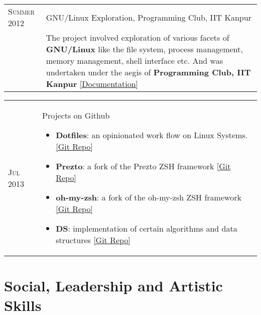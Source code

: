 \documentclass[a4paper,10pt]{article} %
\newcommand{\project}[3]{
    \begin{tabular}{>{\raggedleft}p{2.2cm}|p{17cm}}
        \textsc{#1} & \textcolor{NavyBlue}{#2} \\
                    & \footnotesize{#3} \\
    \end{tabular}
}
\newcommand{\projectlist}[3]{
    \begin{tabular}{>{\raggedleft}p{2.2cm}|p{17cm}}
        \textsc{#1} & #2
                    \footnotesize{#3}
    \end{tabular}
}
\begin{document}
\project {Summer 2012}
         {GNU/Linux Exploration, Programming Club, IIT Kanpur}
         {The project involved exploration of various facets of
          \textbf{GNU/Linux} like the file system, process management,
          memory management, shell interface etc. And was
          undertaken under the aegis of \textbf{Programming Club, IIT Kanpur}
          \href{https://docs.google.com/document/d/1ZHO9w36aoq3oaZBR4Um1AOmDfiTDAEgM6baQAu3icw4/edit?usp=sharing}
          {[Documentation]} }

\projectlist {Jul 2013}
         {Projects on Github}
         {
             \begin{itemize}[leftmargin=*]
                 \item \textbf{Dotfiles}: an opinionated work flow on Linux Systems.
                     \href{https://github.com/srijanshetty/dotfiles} {[Git Repo]}
                 \item \textbf{Prezto}: a fork of the Prezto ZSH framework
                     \href{https://github.com/srijanshetty/prezto} {[Git Repo]}
                 \item \textbf{oh-my-zsh}: a fork of the oh-my-zsh ZSH framework
                     \href{https://github.com/srijanshetty/oh-my-zsh} {[Git Repo]}
                 \item \textbf{DS}: implementation of certain algorithms and data structures
                     \href{https://github.com/srijanshetty/DS} {[Git Repo]}
             \end{itemize}
         }


\section {Social, Leadership and Artistic Skills}
\end{document}
